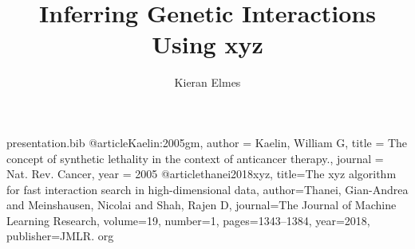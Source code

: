 \begin{filecontents*}{presentation.bib}
@article{Kaelin:2005gm,
	author = {Kaelin, William G},
	title = {{The concept of synthetic lethality in the context of anticancer therapy.}},
	journal = {Nat. Rev. Cancer},
	year = {2005}
}
@article{thanei2018xyz,
	title={The xyz algorithm for fast interaction search in high-dimensional data},
	author={Thanei, Gian-Andrea and Meinshausen, Nicolai and Shah, Rajen D},
	journal={The Journal of Machine Learning Research},
	volume={19},
	number={1},
	pages={1343--1384},
	year={2018},
	publisher={JMLR. org}
}
\end{filecontents*}

\documentclass[8pt]{beamer}

\usepackage[style=numeric,firstinits=true,backend=biber]{biblatex}

\usepackage{todonotes}



\title{Inferring Genetic Interactions Using xyz}
\author{Kieran Elmes}

\begin{frame}[plain]
    \maketitle
\end{frame}

